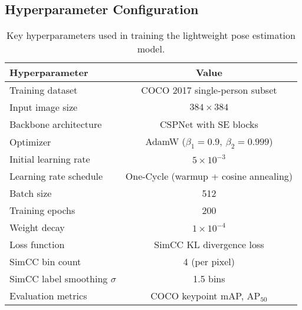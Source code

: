 \subsection{Hyperparameter Configuration}

\begin{table}[h]
\centering
\begin{tabular}{l c}
\toprule
\textbf{Hyperparameter} & \textbf{Value} \\
\midrule
Training dataset             & COCO 2017 single-person subset \\
Input image size             & $384\times384$ \\
Backbone architecture        & CSPNet with SE blocks \\
Optimizer                    & AdamW ($\beta_1=0.9,\ \beta_2=0.999$) \\
Initial learning rate        & $5\times10^{-3}$ \\
Learning rate schedule       & One-Cycle (warmup + cosine annealing) \\
Batch size                   & 512 \\
Training epochs              & 200 \\
Weight decay                 & $1\times10^{-4}$ \\
Loss function                & SimCC KL divergence loss \\
SimCC bin count              & 4 (per pixel) \\
SimCC label smoothing $\sigma$ & 1.5 bins \\
Evaluation metrics           & COCO keypoint mAP, AP$_{50}$ \\
\bottomrule
\end{tabular}
\caption{Key hyperparameters used in training the lightweight pose estimation model.}
\label{tab:hyperparams}
\end{table}